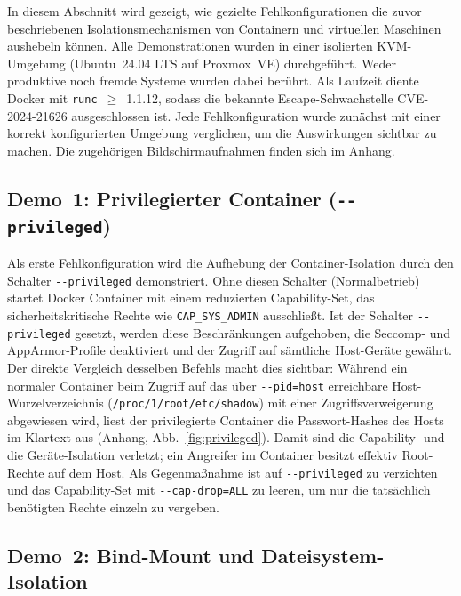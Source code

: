 \documentclass[conference]{IEEEtran}
\begin{document}
In diesem Abschnitt wird gezeigt, wie gezielte Fehlkonfigurationen die
zuvor beschriebenen Isolationsmechanismen von Containern und virtuellen
Maschinen aushebeln können. Alle Demonstrationen wurden in einer isolierten
KVM-Umgebung (Ubuntu~24.04 LTS auf Proxmox~VE) durchgeführt. Weder produktive 
noch fremde Systeme wurden dabei berührt. Als Laufzeit diente Docker mit 
\texttt{runc}~$\geq$~1.1.12, sodass die bekannte Escape-Schwachstelle \mbox{CVE-2024-21626} ausgeschlossen ist. 
Jede Fehlkonfiguration wurde zunächst mit einer korrekt konfigurierten Umgebung verglichen, 
um die Auswirkungen sichtbar zu machen. Die zugehörigen Bildschirmaufnahmen finden sich im Anhang.

\subsection{Demo~1: Privilegierter Container (\texttt{-{}-privileged})}

Als erste Fehlkonfiguration wird die Aufhebung der Container-Isolation durch den Schalter \texttt{-{}-privileged} demonstriert. 
Ohne diesen Schalter (Normalbetrieb) startet Docker Container mit einem reduzierten Capability-Set, 
das sicherheitskritische Rechte wie \texttt{CAP\_SYS\_ADMIN} ausschließt.
Ist der Schalter \texttt{-{}-privileged} gesetzt, werden diese Beschränkungen aufgehoben,
die Seccomp- und AppArmor-Profile deaktiviert und der Zugriff auf sämtliche Host-Geräte gewährt. 
Der direkte Vergleich desselben Befehls macht dies sichtbar: 
Während ein normaler Container beim Zugriff auf das über \texttt{-{}-pid=host} erreichbare 
Host-Wurzelverzeichnis (\texttt{/proc/1/root/etc/shadow}) mit einer Zugriffsverweigerung abgewiesen wird,
liest der privilegierte Container die Passwort-Hashes des Hosts im Klartext aus 
(Anhang, Abb.~\ref{fig:privileged}). Damit sind die Capability- und die Geräte-Isolation verletzt; 
ein Angreifer im Container besitzt effektiv Root-Rechte auf dem Host. 
Als Gegenmaßnahme ist auf \texttt{-{}-privileged} zu verzichten und das Capability-Set mit 
\texttt{-{}-cap-drop=ALL} zu leeren, um nur die tatsächlich benötigten Rechte einzeln zu vergeben.

\subsection{Demo~2: Bind-Mount und Dateisystem-Isolation}
\end{document}
